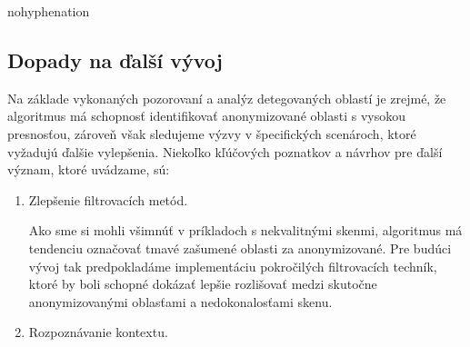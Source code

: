 \begin{hyphenrules}{nohyphenation}
\begin{figure}[H]
\begin{minipage}[b]{.4\linewidth}
\end{minipage}
\end{figure}

\subsection{Dopady na ďalší vývoj}
Na základe vykonaných pozorovaní a analýz detegovaných oblastí je zrejmé, že algoritmus má schopnosť identifikovať anonymizované oblasti s vysokou presnosťou, zároveň však sledujeme výzvy v špecifických scenároch, ktoré vyžadujú ďalšie vylepšenia. Niekoľko kľúčových poznatkov a návrhov pre ďalší význam, ktoré uvádzame, sú:
\begin{enumerate}
    \item Zlepšenie filtrovacích metód. 
    
    Ako sme si mohli všimnúť v príkladoch s nekvalitnými skenmi, algoritmus má tendenciu označovať tmavé zašumené oblasti za anonymizované. Pre budúci vývoj tak predpokladáme implementáciu pokročilých filtrovacích techník, ktoré by boli schopné dokázať lepšie rozlišovať medzi skutočne anonymizovanými oblasťami a nedokonalosťami skenu.
    \item Rozpoznávanie kontextu. 
    

\end{enumerate}
\end{hyphenrules}
